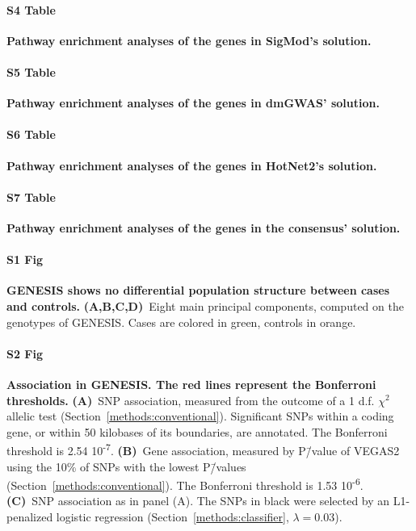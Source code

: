 \documentclass[10pt,letterpaper]{article}
\begin{document}
\paragraph*{S4 Table}
\label{stab:sigmod_pwy}
\textbf{Pathway enrichment analyses of the genes in SigMod's solution.}

\paragraph*{S5 Table}
\label{stab:dmgwas_pwy}
\textbf{Pathway enrichment analyses of the genes in dmGWAS' solution.}

\paragraph*{S6 Table}
\label{stab:hotnet2_pwy}
\textbf{Pathway enrichment analyses of the genes in HotNet2's solution.}

\paragraph*{S7 Table}
\label{stab:consensus_pwy}
\textbf{Pathway enrichment analyses of the genes in the consensus' solution.}

\paragraph*{S1 Fig}
\label{sfig:pcs}
\textbf{GENESIS shows no differential population structure between cases and controls.} \textbf{(A,B,C,D)}~Eight main principal components, computed on the genotypes of GENESIS. Cases are colored in green, controls in orange.

\paragraph*{S2 Fig}
\label{sfig:snp_gene_manhattan}
\textbf{Association in GENESIS. The red lines represent the Bonferroni thresholds.} \textbf{(A)}~SNP association, measured from the outcome of a 1 d.f. $\chi^2$ allelic test (Section~\ref{methods:conventional}). Significant SNPs within a coding gene, or within 50 kilobases of its boundaries, are annotated. The Bonferroni threshold is 2.54 \texttimes{} 10\textsuperscript{-7}. \textbf{(B)}~Gene association, measured by P\=/value of VEGAS2 \cite{mishra_vegas2:_2015} using the 10\% of SNPs with the lowest P\=/values (Section~\ref{methods:conventional}). The Bonferroni threshold is 1.53 \texttimes{} 10\textsuperscript{-6}. \textbf{(C)}~SNP association as in panel (A). The SNPs in black were selected by an L1-penalized logistic regression (Section~\ref{methods:classifier}, $\lambda = 0.03$).
\end{document}
